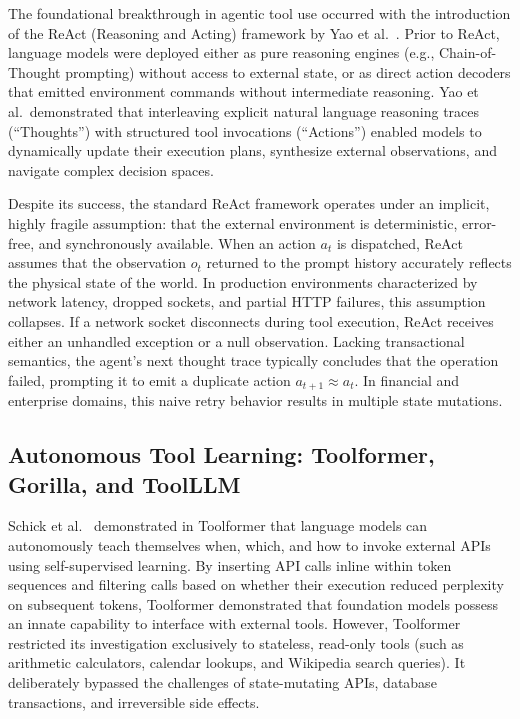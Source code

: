 The foundational breakthrough in agentic tool use occurred with the introduction of the ReAct (Reasoning and Acting) framework by Yao et al.\ \cite{yao2022react}. Prior to ReAct, language models were deployed either as pure reasoning engines (e.g., Chain-of-Thought prompting) without access to external state, or as direct action decoders that emitted environment commands without intermediate reasoning. Yao et al.\ demonstrated that interleaving explicit natural language reasoning traces (``Thoughts'') with structured tool invocations (``Actions'') enabled models to dynamically update their execution plans, synthesize external observations, and navigate complex decision spaces.

Despite its success, the standard ReAct framework operates under an implicit, highly fragile assumption: that the external environment is deterministic, error-free, and synchronously available. When an action $a_t$ is dispatched, ReAct assumes that the observation $o_t$ returned to the prompt history accurately reflects the physical state of the world. In production environments characterized by network latency, dropped sockets, and partial HTTP failures, this assumption collapses. If a network socket disconnects during tool execution, ReAct receives either an unhandled exception or a null observation. Lacking transactional semantics, the agent's next thought trace typically concludes that the operation failed, prompting it to emit a duplicate action $a_{t+1} \approx a_t$. In financial and enterprise domains, this naive retry behavior results in multiple state mutations.

\subsection{Autonomous Tool Learning: Toolformer, Gorilla, and ToolLLM}

Schick et al.\ \cite{schick2023toolformer} demonstrated in Toolformer that language models can autonomously teach themselves when, which, and how to invoke external APIs using self-supervised learning. By inserting API calls inline within token sequences and filtering calls based on whether their execution reduced perplexity on subsequent tokens, Toolformer demonstrated that foundation models possess an innate capability to interface with external tools. However, Toolformer restricted its investigation exclusively to stateless, read-only tools (such as arithmetic calculators, calendar lookups, and Wikipedia search queries). It deliberately bypassed the challenges of state-mutating APIs, database transactions, and irreversible side effects.

